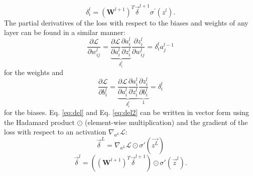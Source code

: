 \documentclass[a4paper, 12pt, twoside]{article}
\begin{document}
\begin{appendices}
\begin{equation}
	\delta_i^l = (\bm{W}^{l+1})^T\vec{\delta}^{l+1}\sigma^\prime(z^l).
	\label{eq:del2}
\end{equation}
The partial derivatives of the loss with respect to the biases and weights of any layer can be found in a similar manner:
\begin{equation}
	\frac{\partial\mathscr{L}}{\partial w^l_{ij}} = \underbrace{\frac{\partial \mathscr{L}}{\partial a_i^l}\frac{\partial a_i^l}{\partial z_i^l}}_{\delta_i^l}\frac{\partial z_i^l}{\partial w^l_{ij}}=\delta_i^la_j^{l-1}
\end{equation}
for the weights and 
\begin{equation}
	\frac{\partial \mathscr{L}}{\partial b^l_i} = \underbrace{\frac{\partial \mathscr{L}}{\partial a_i^l}\frac{\partial a_i^l}{\partial z_i^l}}_{\delta_i^l}\underbrace{\frac{\partial z_i^l}{\partial b_i^l}}_{1} = \delta^l_i
\end{equation}
for the biases. Eq. \ref{eq:del} and Eq. \ref{eq:del2} can be written in vector form using the Hadamard product $\odot$ (element-wise multiplication) and the gradient of the loss with respect to an activation $\nabla_{a^L}\mathscr{L}$:
\begin{equation}
	\vec{\delta}^L= \nabla_{a^L} \mathscr{L}\odot \sigma'(\vec{z^{L}})
\end{equation}
\begin{equation}
	\vec{\delta}^l = ((\textbf{W}^{l+1})^{T}\vec{\delta}^{l+1})\odot\sigma'(\vec{z}^l).
\end{equation}


\end{appendices}
\end{document}
